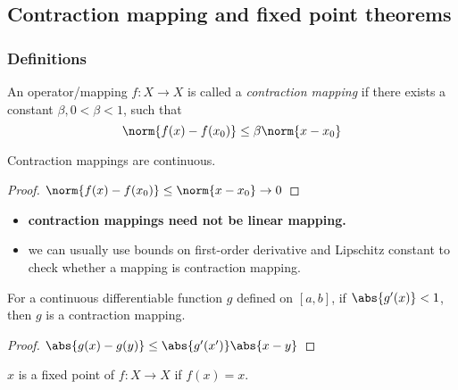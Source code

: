\begin{refsection}
\subsection{Contraction mapping and fixed point theorems}\label{ch:functional-analysis:sec:contraction-mapping-and-fixed-point-theorems}
\subsubsection{Definitions}

\begin{definition}
	\cite[121]{griffel2002applied}\cite[29]{debnath2005hilbert}
	An operator/mapping $f:X\rightarrow X$ is called a \emph{contraction mapping} if there exists a constant $\beta,0<\beta < 1$, such that
	$$\norm{f(x)-f(x_0)} \leq \beta \norm{x-x_0}$$
\end{definition}


\begin{lemma}
	Contraction mappings are continuous.
\end{lemma}
\begin{proof}
	$\norm{f(x)-f(x_0)} \leq \norm{x-x_0} \to 0$
\end{proof}


\begin{remark}\hfill
	\begin{itemize}
		\item \textbf{contraction mappings need not be linear mapping.}
		\item we can usually use bounds on first-order derivative and Lipschitz constant to check whether a mapping is contraction mapping.
	\end{itemize}
\end{remark}

\begin{lemma}
	For a continuous differentiable function $g$ defined on $[a,b]$, if $\abs{g'(x)} < 1$, then $g$ is a contraction mapping.
\end{lemma}
\begin{proof}
	$\abs{g(x)-g(y)} \leq \abs{g'(x')}\abs{x-y}$
\end{proof}




\begin{definition}
	$x$ is a fixed point of $f:X\rightarrow X$ if  $f(x)=x$.
\end{definition}



\end{refsection}
